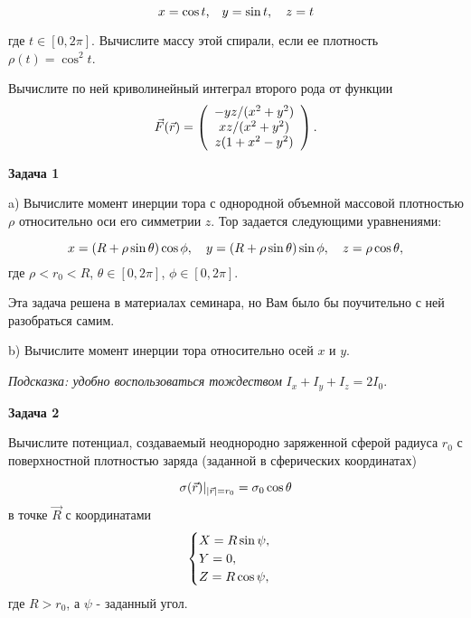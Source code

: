\documentclass[a4paper,12pt]{article}
\begin{document}
\begin{equation}
x=\cos t\text{,}\quad y=\sin t,\quad z=t
\notag
\end{equation}	

\noindent где $t\in[0,2\pi]$. Вычислите массу этой спирали, если ее плотность $\rho(t)=\cos^{2}t$.

\noindent Вычислите по ней криволинейный интеграл второго рода от функции
\begin{equation} \notag
\vec{F}(\vec{r})	=\left(\begin{array}{c}
-yz/(x^{2}+y^{2})\\
xz/(x^{2}+y^{2})\\
z(1+x^{2}-y^{2})
\end{array}\right).
\end{equation}

\vspace{15pt}
\noindent \textbf{Задача 1}

\noindent a) Вычислите момент инерции тора с однородной объемной массовой плотностью $\rho$ относительно оси его симметрии $z$. Тор задается следующими уравнениями:

\begin{equation}\notag
x	=(R+\rho\sin\theta)\cos\phi,\quad y=(R+\rho\sin\theta)\sin\phi,\quad z=\rho\cos\theta,
\end{equation}
\noindent где $\rho<r_{0}<R$, $\theta\in[0,2\pi]$, $\phi\in[0,2\pi]$.

\noindent Эта задача решена в материалах семинара, но Вам было бы поучительно с ней разобраться самим.

\noindent b) Вычислите момент инерции тора относительно осей $x$ и $y$.

\noindent \textit{Подсказка: удобно воспользоваться тождеством} $I_{x}+I_{y}+I_{z}=2I_{0}$.

\vspace{15pt}
\noindent \textbf{Задача 2}

\noindent Вычислите потенциал, создаваемый неоднородно заряженной сферой радиуса $r_{0}$ с поверхностной плотностью заряда (заданной в сферических координатах)

\begin{equation}\notag
\sigma(\vec{r})|_{|\vec{r}|=r_{0}}	=\sigma_{0}\cos\theta
\end{equation}
\noindent в точке $\vec{R}$ с координатами
\begin{equation}
\begin{cases}
X=R\sin\psi,\\
Y=0,\\
Z=R\cos\psi,
\end{cases}\notag
\end{equation}
\noindent где $R>r_{0}$, а $\psi$ - заданный угол. 
\end{document}
